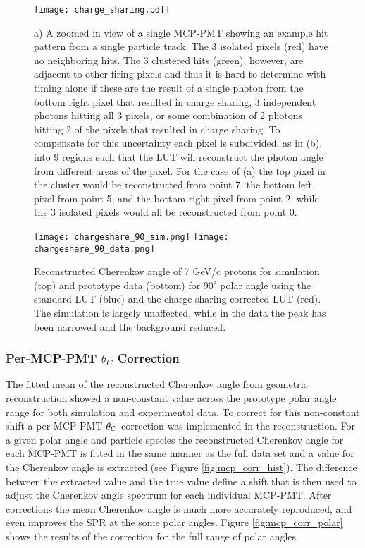 \begin{figure}[!htb]
	\centering
	\texttt{[image: charge\_sharing.pdf]}
	\caption{a) A zoomed in view of a single MCP-PMT showing an example hit pattern from a single particle track. The 3 isolated pixels (red) have no neighboring hits. The 3 clustered hits (green), however, are adjacent to other firing pixels and thus it is hard to determine with timing alone if these are the result of a single photon from the bottom right pixel that resulted in charge sharing, 3 independent photons hitting all 3 pixels, or some combination of 2 photons hitting 2 of the pixels that resulted in charge sharing. To compensate for this uncertainty each pixel is subdivided, as in (b), into 9 regions such that the LUT will reconstruct the photon angle from different areas of the pixel. For the case of (a) the top pixel in the cluster would be reconstructed from point 7, the bottom left pixel from point 5, and the bottom right pixel from point 2, while the 3 isolated pixels would all be reconstructed from point 0.}
	\label{fig:charge_sharing}
\end{figure}

\begin{figure}[!htb]
	\centering
	\texttt{[image: chargeshare\_90\_sim.png]}
	\texttt{[image: chargeshare\_90\_data.png]}
	\caption{Reconstructed Cherenkov angle of 7 GeV/c protons for simulation (top) and prototype data (bottom) for $90^\circ$ polar angle using the standard LUT (blue) and the charge-sharing-corrected LUT (red). The simulation is largely unaffected, while in the data the peak has been narrowed and the background reduced.}
	\label{fig:charge_sharing_reco}
\end{figure}


\subsubsection{Per-MCP-PMT $\theta_{C}$ Correction}
The fitted mean of the reconstructed Cherenkov angle from geometric reconstruction showed a non-constant value across the prototype polar angle range for both simulation and experimental data. To correct for this non-constant shift a per-MCP-PMT $\theta_{C}$ correction was implemented in the reconstruction. For a given polar angle and particle species the reconstructed Cherenkov angle for each MCP-PMT is fitted in the same manner as the full data set and a value for the Cherenkov angle is extracted (see Figure \ref{fig:mcp_corr_hist}). The difference between the extracted value and the true value define a shift that is then used to adjust the Cherenkov angle spectrum for each individual MCP-PMT. After corrections the mean Cherenkov angle is much more accurately reproduced, and even improves the SPR at the some polar angles. Figure \ref{fig:mcp_corr_polar} shows the results of the correction for the full range of polar angles.

